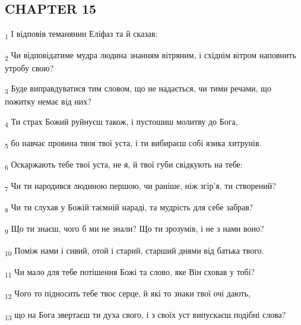 \subsection{CHAPTER 15}
\begin{tcolorbox}
\textsubscript{1} І відповів теманянин Еліфаз та й сказав:
\end{tcolorbox}
\begin{tcolorbox}
\textsubscript{2} Чи відповідатиме мудра людина знанням вітряним, і східнім вітром наповнить утробу свою?
\end{tcolorbox}
\begin{tcolorbox}
\textsubscript{3} Буде виправдуватися тим словом, що не надається, чи тими речами, що пожитку немає від них?
\end{tcolorbox}
\begin{tcolorbox}
\textsubscript{4} Ти страх Божий руйнуєш також, і пустошиш молитву до Бога,
\end{tcolorbox}
\begin{tcolorbox}
\textsubscript{5} бо навчає провина твоя твої уста, і ти вибираєш собі язика хитрунів.
\end{tcolorbox}
\begin{tcolorbox}
\textsubscript{6} Оскаржають тебе твої уста, не я, й твої губи свідкують на тебе:
\end{tcolorbox}
\begin{tcolorbox}
\textsubscript{7} Чи ти народився людиною першою, чи раніше, ніж згір'я, ти створений?
\end{tcolorbox}
\begin{tcolorbox}
\textsubscript{8} Чи ти слухав у Божій таємній нараді, та мудрість для себе забрав?
\end{tcolorbox}
\begin{tcolorbox}
\textsubscript{9} Що ти знаєш, чого б ми не знали? Що ти зрозумів, і не з нами воно?
\end{tcolorbox}
\begin{tcolorbox}
\textsubscript{10} Поміж нами і сивий, отой і старий, старший днями від батька твого.
\end{tcolorbox}
\begin{tcolorbox}
\textsubscript{11} Чи мало для тебе потішення Божі та слово, яке Він сховав у тобі?
\end{tcolorbox}
\begin{tcolorbox}
\textsubscript{12} Чого то підносить тебе твоє серце, й які то знаки твої очі дають,
\end{tcolorbox}
\begin{tcolorbox}
\textsubscript{13} що на Бога звертаєш ти духа свого, і з своїх уст випускаєш подібні слова?
\end{tcolorbox}
